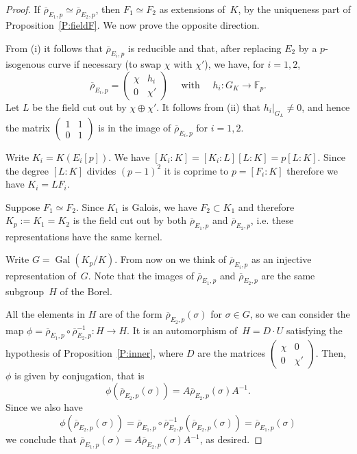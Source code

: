 \documentclass[twoside,leqno,symbols-for-thanks, draft]{rmi}
\numberwithin{equation}{section}
\newcommand{\Fp}{\mathbb{F}_p}
\newcommand{\rhobar}{{\overline{\rho}}}
\DeclareMathOperator{\Gal}{Gal}
\theoremstyle{remark}
\begin{document}
\begin{proof}
  If $\rhobar_{E_1,p} \simeq \rhobar_{E_2,p}$, then $F_1 \simeq F_2$
  as extensions of~$K$, by the uniqueness part of
  Proposition~\ref{P:fieldF}. We now prove the opposite direction.

From (i) it follows that $\rhobar_{E_i,p}$ is reducible and that,
after replacing $E_2$ by a $p$-isogenous curve if necessary (to swap
$\chi$ with $\chi'$), we have, for $i=1,2$,
\[
\rhobar_{E_i,p} =  \begin{pmatrix}
                            \chi & h_i \\
                            0 & \chi'
                            \end{pmatrix} \quad \text{ with } \quad  h_i : G_K \to \Fp.  
\]
Let $L$ be the field cut out 
by $\chi \oplus \chi'$. 
It follows from (ii) that $h_i|_{G_L} \neq 0$, and
hence the matrix $\left(\begin{smallmatrix}
                            1 & 1 \\
                            0 & 1
                            \end{smallmatrix} \right)$  
is in the image of $\rhobar_{E_i,p}$ for $i=1,2$.
                            
Write $K_i = K(E_i[p])$. 
We have $[K_i : K] = [K_i : L][L : K] = p [L : K]$. 
Since the degree $[L : K]$ divides $(p-1)^2$ it is coprime 
to $p = [F_i : K]$ therefore we have $K_i = L F_i$.

Suppose $F_1 \simeq F_2$. Since $K_1$ is Galois, we have $F_2 \subset K_1$ and therefore $K_p := K_1 = K_2$ is the field cut out by both
$\rhobar_{E_1,p}$ and $\rhobar_{E_2,p}$, i.e. these representations have the same kernel.

Write $G = \Gal(K_p / K)$. From now on we think of $\rhobar_{E_i,p}$ as an injective representation of~$G$. Note that the images of $\rhobar_{E_1,p}$ and $\rhobar_{E_2,p}$
are the same subgroup~$H$ of the Borel.

All the elements in $H$ are of the form $\rhobar_{E_2,p}(\sigma)$ for $\sigma \in G$, so we can consider the map $\phi = \rhobar_{E_1,p} \circ \rhobar_{E_2,p}^{-1} : H \to H$. It is an automorphism of~$H = D\cdot U$ satisfying the hypothesis of Proposition~\ref{P:inner}, where $D$ are 
the matrices $\left(\begin{smallmatrix}
                            \chi & 0 \\
                            0 & \chi'
                            \end{smallmatrix} \right)$.  
Then, $\phi$ is given by conjugation, that is
\[
 \phi(\rhobar_{E_2,p}(\sigma)) = A \rhobar_{E_2,p}(\sigma) A^{-1}.
\]
Since we also have
\[ 
\phi(\rhobar_{E_2,p}(\sigma)) 
=  \rhobar_{E_1,p} \circ \rhobar_{E_2,p}^{-1}(\rhobar_{E_2,p}(\sigma)) = \rhobar_{E_1,p}(\sigma)
\]
we conclude that $\rhobar_{E_1,p}(\sigma) = A \rhobar_{E_2,p}(\sigma) A^{-1}$, as desired.
\end{proof}
\end{document}
